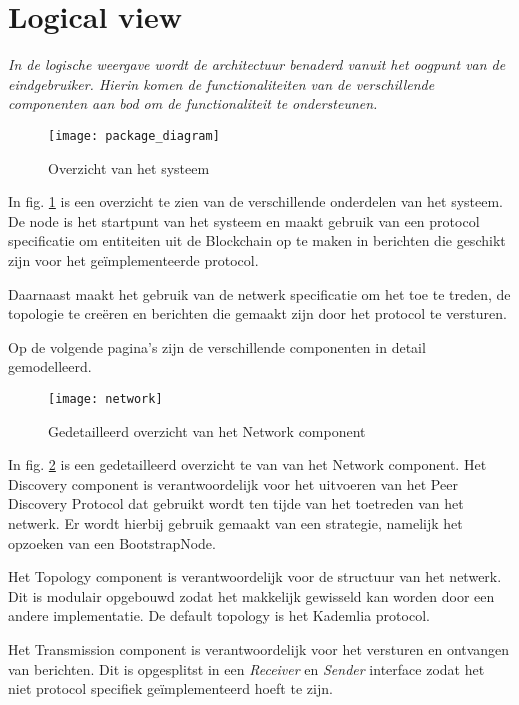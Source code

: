 \section{Logical view}

\textit{In de logische weergave wordt de architectuur benaderd vanuit het oogpunt van de eindgebruiker. Hierin komen de functionaliteiten van de verschillende componenten aan bod om de functionaliteit te ondersteunen.}

\begin{figure}[h]
  \centering
  \texttt{[image: package\_diagram]}
  \caption{Overzicht van het systeem}
  \label{diagram:package}
\end{figure}

In fig. \ref{diagram:package} is een overzicht te zien van de verschillende onderdelen van het systeem. De node is het startpunt van het systeem en maakt gebruik van een protocol specificatie om entiteiten uit de Blockchain op te maken in berichten die geschikt zijn voor het geïmplementeerde protocol. 

Daarnaast maakt het gebruik van de netwerk specificatie om het toe te treden, de topologie te creëren en berichten die gemaakt zijn door het protocol te versturen.

Op de volgende pagina's zijn de verschillende componenten in detail gemodelleerd.

\newpage
\begin{figure}[h]
  \centering
  \texttt{[image: network]}
  \caption{Gedetailleerd overzicht van het Network component}
  \label{diagram:network}
\end{figure}

In fig. \ref{diagram:network} is een gedetailleerd overzicht te van van het Network component. Het Discovery component is verantwoordelijk voor het uitvoeren van het Peer Discovery Protocol dat gebruikt wordt ten tijde van het toetreden van het netwerk. Er wordt hierbij gebruik gemaakt van een strategie, namelijk het opzoeken van een BootstrapNode. 

Het Topology component is verantwoordelijk voor de structuur van het netwerk. Dit is modulair opgebouwd zodat het makkelijk gewisseld kan worden door een andere implementatie. De default topology is het Kademlia protocol.

Het Transmission component is verantwoordelijk voor het versturen en ontvangen van berichten. Dit is opgesplitst in een \textit{Receiver} en \textit{Sender} interface zodat het niet protocol specifiek geïmplementeerd hoeft te zijn.

